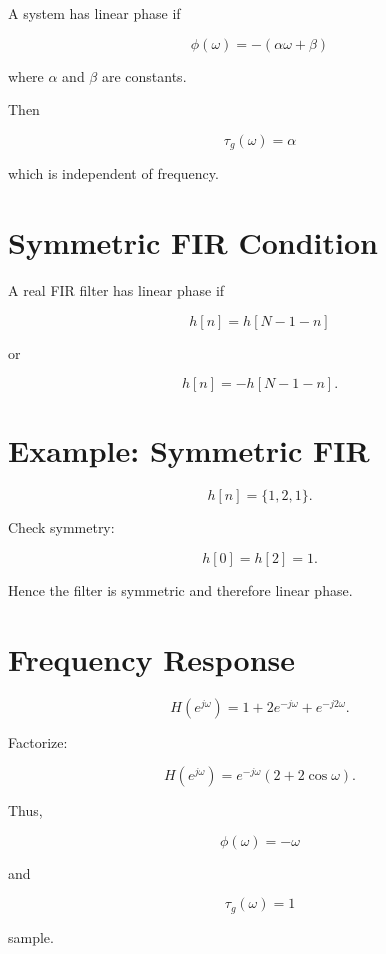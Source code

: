 A system has linear phase if

\[
\boxed{
\phi(\omega)=-(\alpha\omega+\beta)
}
\]

where \(\alpha\) and \(\beta\) are constants.

Then

\[
\boxed{
\tau_g(\omega)=\alpha
}
\]

which is independent of frequency.


\section{Symmetric FIR Condition}

A real FIR filter has linear phase if

\[
\boxed{
h[n]=h[N-1-n]
}
\]

or

\[
\boxed{
h[n]=-h[N-1-n].
}
\]


\section{Example: Symmetric FIR}

\[
h[n]=\{1,2,1\}.
\]

Check symmetry:

\[
h[0]=h[2]=1.
\]

Hence the filter is symmetric and therefore linear phase.


\section{Frequency Response}

\[
H(e^{j\omega})=
1+2e^{-j\omega}+e^{-j2\omega}.
\]

Factorize:

\[
H(e^{j\omega})=
e^{-j\omega}(2+2\cos\omega).
\]

Thus,

\[
\boxed{
\phi(\omega)=-\omega
}
\]

and

\[
\boxed{
\tau_g(\omega)=1
}
\]

sample.


